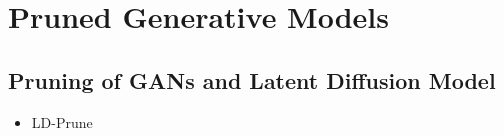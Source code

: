 \chapter{Pruned Generative Models}
\label{chap:pruning}
\section{Pruning of GANs and Latent Diffusion Model}
\begin{itemize}
    \item LD-Prune
\end{itemize}